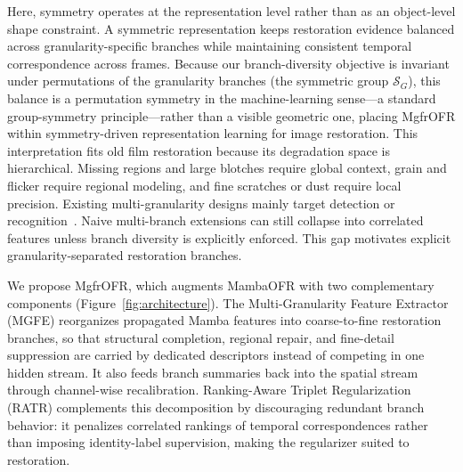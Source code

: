 \documentclass[symmetry,article,submit,pdftex,moreauthors]{Definitions/mdpi}
\begin{document}
Here, symmetry operates at the representation level rather than as an object-level shape constraint. A symmetric representation keeps restoration evidence balanced across granularity-specific branches while maintaining consistent temporal correspondence across frames. Because our branch-diversity objective is invariant under permutations of the granularity branches (the symmetric group $\mathcal{S}_G$), this balance is a permutation symmetry in the machine-learning sense---a standard group-symmetry principle---rather than a visible geometric one, placing MgfrOFR within symmetry-driven representation learning for image restoration. This interpretation fits old film restoration because its degradation space is hierarchical. Missing regions and large blotches require global context, grain and flicker require regional modeling, and fine scratches or dust require local precision. Existing multi-granularity designs mainly target detection or recognition~\cite{lin2017fpn,wang2021hrnet,sun2018pcb,wang2018mgn,gu2025reidmamba}. Naive multi-branch extensions can still collapse into correlated features unless branch diversity is explicitly enforced. This gap motivates explicit granularity-separated restoration branches.

We propose MgfrOFR, which augments MambaOFR with two complementary components (Figure~\ref{fig:architecture}). The Multi-Granularity Feature Extractor (MGFE) reorganizes propagated Mamba features into coarse-to-fine restoration branches, so that structural completion, regional repair, and fine-detail suppression are carried by dedicated descriptors instead of competing in one hidden stream. It also feeds branch summaries back into the spatial stream through channel-wise recalibration. Ranking-Aware Triplet Regularization (RATR) complements this decomposition by discouraging redundant branch behavior: it penalizes correlated rankings of temporal correspondences rather than imposing identity-label supervision, making the regularizer suited to restoration.
\end{document}
